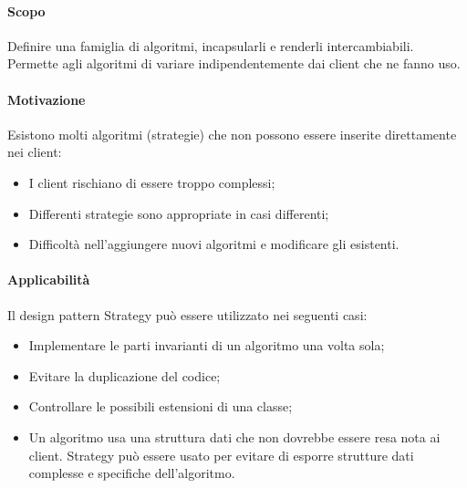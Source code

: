\paragraph{Scopo\\}
Definire una famiglia di algoritmi, incapsularli e renderli intercambiabili. Permette agli algoritmi di variare indipendentemente dai client che ne fanno uso.

\paragraph{Motivazione\\}
Esistono molti algoritmi (strategie) che non possono essere inserite direttamente nei client:
\begin{itemize}
\item I client rischiano di essere troppo complessi;
\item Differenti strategie sono appropriate in casi differenti;
\item Difficoltà nell'aggiungere nuovi algoritmi e modificare gli esistenti.
\end{itemize}

\paragraph{Applicabilità\\}
Il design pattern\glossario{} Strategy può essere utilizzato nei seguenti casi:
\begin{itemize}
\item Implementare le parti invarianti di un algoritmo una volta sola;
\item Evitare la duplicazione del codice;
\item Controllare le possibili estensioni di una classe;
\item Un algoritmo usa una struttura dati che non dovrebbe essere resa nota ai client. Strategy può essere usato per evitare di esporre strutture dati complesse e specifiche dell'algoritmo.
\end{itemize}